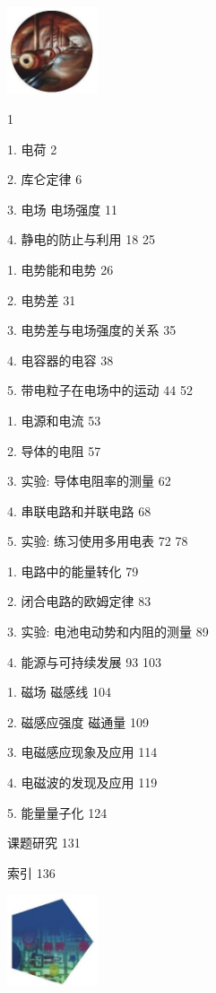 \documentclass[10pt]{article}
\begin{document}
\begin{center}
\includegraphics[max width=0.2\textwidth]{images/01911d5f-8e38-70c0-b5b8-2b399bd115b6_4_265833.jpg}
\end{center}

1

1. 电荷 2

2. 库仑定律 6

3. 电场 电场强度 11

4. 静电的防止与利用 18 25

1. 电势能和电势 26

2. 电势差 31

3. 电势差与电场强度的关系 35

4. 电容器的电容 38

5. 带电粒子在电场中的运动 44 52

1. 电源和电流 53

2. 导体的电阻 57

3. 实验: 导体电阻率的测量 62

4. 串联电路和并联电路 68

5. 实验: 练习使用多用电表 72 78

1. 电路中的能量转化 79

2. 闭合电路的欧姆定律 83

3. 实验: 电池电动势和内阻的测量 89

4. 能源与可持续发展 93 103

1. 磁场 磁感线 104

2. 磁感应强度 磁通量 109

3. 电磁感应现象及应用 114

4. 电磁波的发现及应用 119

5. 能量量子化 124

课题研究 131

索引 136

\begin{center}
\includegraphics[max width=0.2\textwidth]{images/01911d5f-8e38-70c0-b5b8-2b399bd115b6_4_596129.jpg}
\end{center}
\end{document}
